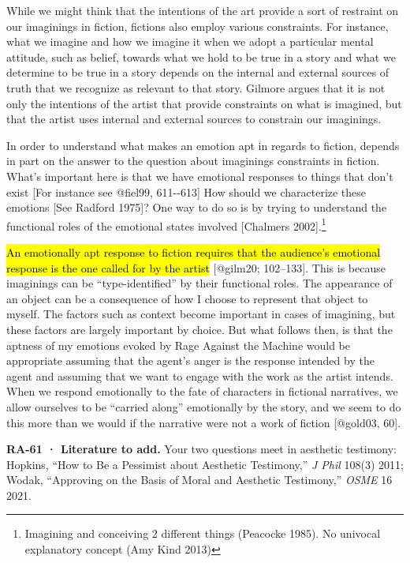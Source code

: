\documentclass[
  letterpaper,
  DIV=11,
  numbers=noendperiod]{scrartcl}
\theoremstyle{remark}
\begin{document}
While we might think that the intentions of the art provide a sort of
restraint on our imaginings in fiction, fictions also employ various
constraints. For instance, what we imagine and how we imagine it when we
adopt a particular mental attitude, such as belief, towards what we hold
to be true in a story and what we determine to be true in a story
depends on the internal and external sources of truth that we recognize
as relevant to that story. Gilmore argues that it is not only the
intentions of the artist that provide constraints on what is imagined,
but that the artist uses internal and external sources to constrain our
imaginings.

In order to understand what makes an emotion apt in regards to fiction,
depends in part on the answer to the question about imaginings
constraints in fiction. What's important here is that we have emotional
responses to things that don't exist {[}For instance see @fiel99,
611-\/-613{]} How should we characterize these emotions {[}See Radford
1975{]}? One way to do so is by trying to understand the functional
roles of the emotional states involved {[}Chalmers 2002{]}.\footnote{Imagining
  and conceiving 2 different things (Peacocke 1985). No univocal
  explanatory concept (Amy Kind 2013)}

\hl{An emotionally apt response to fiction requires that the audience's
emotional response is the one called for by the artist} {[}@gilm20;
102--133{]}. This is because imaginings can be ``type-identified'' by
their functional roles. The appearance of an object can be a consequence
of how I choose to represent that object to myself. The factors such as
context become important in cases of imagining, but these factors are
largely important by choice. But what follows then, is that the aptness
of my emotions evoked by Rage Against the Machine would be appropriate
assuming that the agent's anger is the response intended by the agent
and assuming that we want to engage with the work as the artist intends.
When we respond emotionally to the fate of characters in fictional
narratives, we allow ourselves to be ``carried along'' emotionally by
the story, and we seem to do this more than we would if the narrative
were not a work of fiction {[}@gold03, 60{]}.

\begin{tcolorbox}[enhanced jigsaw, arc=.35mm, bottomrule=.15mm, bottomtitle=1mm, breakable, colback=white, colbacktitle=quarto-callout-tip-color!10!white, colframe=quarto-callout-tip-color-frame, coltitle=black, left=2mm, leftrule=.75mm, opacityback=0, opacitybacktitle=0.6, rightrule=.15mm, title=\textcolor{quarto-callout-tip-color}{\faLightbulb}\hspace{0.5em}{Tip}, titlerule=0mm, toprule=.15mm, toptitle=1mm]

\textbf{RA-61 · Literature to add.} Your two questions meet in aesthetic
testimony: Hopkins, ``How to Be a Pessimist about Aesthetic Testimony,''
\emph{J Phil} 108(3) 2011; Wodak, ``Approving on the Basis of Moral and
Aesthetic Testimony,'' \emph{OSME} 16 2021.

\end{tcolorbox}
\end{document}

